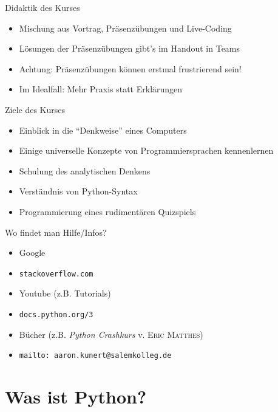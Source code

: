 \begin{frame}
	\begin{block}{Didaktik des Kurses}
		\begin{itemize}
			\item Mischung aus Vortrag, Präsenzübungen und Live-Coding
			\item Lösungen der Präsenzübungen gibt's im Handout in Teams
			\item Achtung: Präsenzübungen können erstmal frustrierend sein!
			\item Im Idealfall: Mehr Praxis statt Erklärungen
		\end{itemize}
	\end{block}
\end{frame}

\begin{frame}
	\begin{block}{Ziele des Kurses}
		\begin{itemize}
			\item Einblick in die \enquote{Denkweise} eines Computers
			\item Einige universelle Konzepte von Programmiersprachen kennenlernen
			\item Schulung des analytischen Denkens
			\item Verständnis von Python-Syntax
			\item Programmierung eines rudimentären Quizspiels
		\end{itemize}
	\end{block}
\end{frame}

\begin{frame}
	\begin{block}{Wo findet man Hilfe/Infos?}
		\vspace{2pt}
		\begin{itemize}
			\item Google
			\item \texttt{stackoverflow.com}
			\item Youtube (z.B. Tutorials)
			\item \texttt{docs.python.org/3}
			\item Bücher (z.B. \textit{Python Crashkurs} v. \textsc{Eric Matthes})
			\item \texttt{mailto: aaron.kunert@salemkolleg.de}
		\end{itemize}
	\end{block}
\end{frame}


\section{Was ist Python?}

